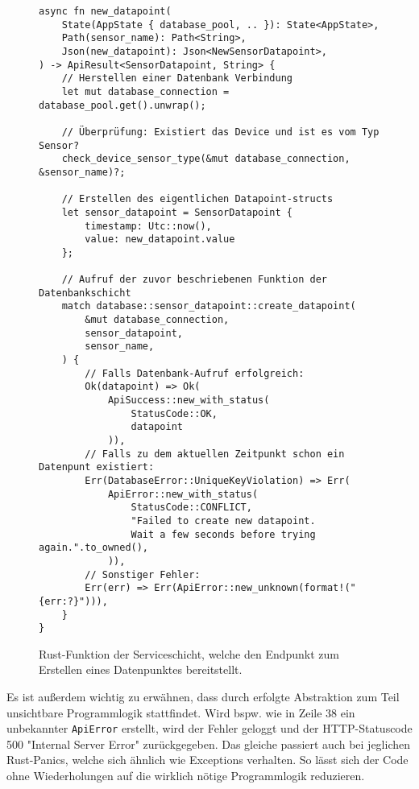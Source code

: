     \begin{figure}[H]
        \centering
        \begin{verbatim}
async fn new_datapoint(
    State(AppState { database_pool, .. }): State<AppState>,
    Path(sensor_name): Path<String>,
    Json(new_datapoint): Json<NewSensorDatapoint>,
) -> ApiResult<SensorDatapoint, String> {
    // Herstellen einer Datenbank Verbindung
    let mut database_connection = database_pool.get().unwrap();

    // Überprüfung: Existiert das Device und ist es vom Typ Sensor?
    check_device_sensor_type(&mut database_connection, &sensor_name)?;

    // Erstellen des eigentlichen Datapoint-structs
    let sensor_datapoint = SensorDatapoint {
        timestamp: Utc::now(),
        value: new_datapoint.value
    };

    // Aufruf der zuvor beschriebenen Funktion der Datenbankschicht
    match database::sensor_datapoint::create_datapoint(
        &mut database_connection,
        sensor_datapoint,
        sensor_name,
    ) {
        // Falls Datenbank-Aufruf erfolgreich:
        Ok(datapoint) => Ok(
            ApiSuccess::new_with_status(
                StatusCode::OK,
                datapoint
            )),
        // Falls zu dem aktuellen Zeitpunkt schon ein Datenpunt existiert:
        Err(DatabaseError::UniqueKeyViolation) => Err(
            ApiError::new_with_status(
                StatusCode::CONFLICT,
                "Failed to create new datapoint.
                Wait a few seconds before trying again.".to_owned(),
            )),
        // Sonstiger Fehler:
        Err(err) => Err(ApiError::new_unknown(format!("{err:?}"))),
    }
}
        \end{verbatim}
        \caption{Rust-Funktion der Serviceschicht, welche den Endpunkt zum Erstellen eines Datenpunktes bereitstellt.}
        \label{lst:endpoint-code}
    \end{figure}

    Es ist außerdem wichtig zu erwähnen, dass durch erfolgte Abstraktion zum Teil unsichtbare Programmlogik stattfindet.
    Wird bspw. wie in Zeile 38 ein unbekannter \lstinline{ApiError} erstellt, wird der Fehler geloggt und der HTTP-Statuscode 500 "Internal Server Error" zurückgegeben.
    Das gleiche passiert auch bei jeglichen Rust-Panics, welche sich ähnlich wie Exceptions verhalten.
    So lässt sich der Code ohne Wiederholungen auf die wirklich nötige Programmlogik reduzieren.

\pagebreak
